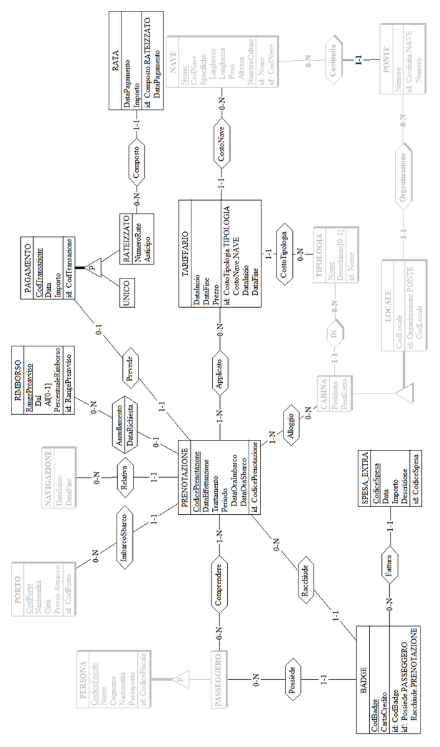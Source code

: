\documentclass[a4paper, titlepage]{report}
\begin{document}
		\begin{figure}[h]
		\centering
		\includegraphics[scale=0.65]{images/Prenotazione.png}		
	\end{figure}
\end{document}
